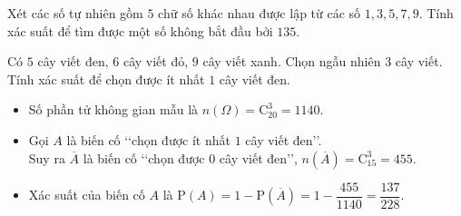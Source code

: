 \begin{vd}
	Xét các số tự nhiên gồm $5$ chữ số khác nhau được lập từ các số $1, 3, 5, 7, 9$. Tính xác suất để tìm được một số không bắt đầu bởi $135$.
\end{vd}
\begin{vd}
	Có $5$ cây viết đen, $6$ cây viết đỏ, $9$ cây viết xanh. Chọn ngẫu nhiên $3$ cây viết. Tính xác suất để chọn được ít nhất $1$ cây viết đen.
	\loigiai
	{
		\begin{itemize}
			\item Số phần tử không gian mẫu là $n(\Omega)=\mathrm{C}_{20}^3=1140$.
			\item Gọi $A$ là biến cố \lq\lq  chọn được ít nhất $1$ cây viết đen\rq\rq.\\
			Suy ra $\overline{A}$ là biến cố \lq\lq  chọn được $0$ cây viết đen\rq\rq, $n(\overline{A})=\mathrm{C}_{15}^3=455$.
			\item Xác suất của biến cố $A$ là $\mathrm{P}(A)=1-\mathrm{P}(\overline{A})=1-\dfrac{455}{1140}=\dfrac{137}{228}$.
		\end{itemize}
	}
\end{vd}
